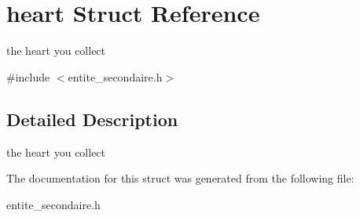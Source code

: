 \hypertarget{structheart}{}\section{heart Struct Reference}
\label{structheart}


the heart you collect  




{\ttfamily \#include $<$entite\+\_\+secondaire.\+h$>$}



\subsection{Detailed Description}
the heart you collect 

The documentation for this struct was generated from the following file\+:\begin{DoxyCompactItemize}
\item 
entite\+\_\+secondaire.\+h\end{DoxyCompactItemize}
